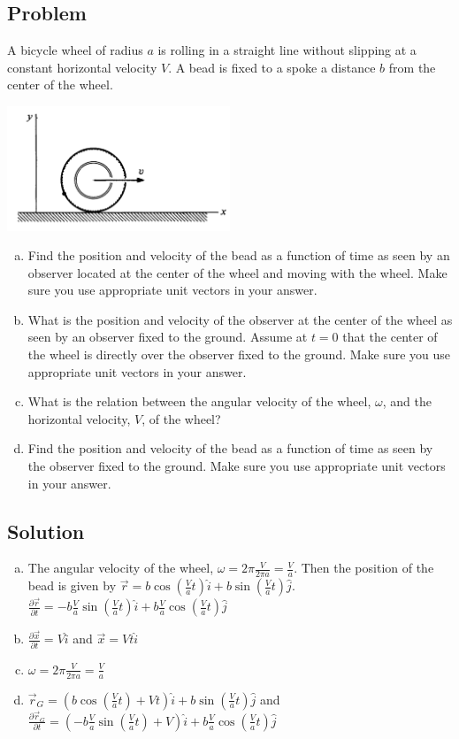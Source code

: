 \documentclass[solutions]{esg8012pset}
\begin{document}
\subsection*{Problem}
  A bicycle wheel of radius $a$ is rolling in a straight line without slipping at a constant horizontal
  velocity $V$. A bead is fixed to a spoke a distance $b$ from the center of the wheel.
  \begin{center}\includegraphics[width=0.5\textwidth]{ps01_3}\end{center}
  \begin{enumerate}[a)]
    \item Find the position and velocity of the bead as a function of time as seen by an observer located
  at the center of the wheel and moving with the wheel. Make sure you use appropriate unit
  vectors in your answer.
    \item What is the position and velocity of the observer at the center of the wheel as seen by an
  observer fixed to the ground. Assume at $t = 0$ that the center of the wheel is directly over the
  observer fixed to the ground. Make sure you use appropriate unit vectors in your answer.
    \item What is the relation between the angular velocity of the wheel, $\omega$, and the horizontal velocity, $V$, of the wheel?
    \item Find the position and velocity of the bead as a function of time as seen by the observer fixed
  to the ground. Make sure you use appropriate unit vectors in your answer.
  \end{enumerate}
\subsection*{Solution}
  \begin{enumerate}[a)]
    \item The angular velocity of the wheel, $\omega = 2\pi \frac{V}{2\pi a} = \frac{V}{a}$.  Then the position of the bead is given by $\vec r = b\cos\left(\frac{V}{a}t\right)\hat i + b\sin\left(\frac{V}{a}t\right)\hat j$.  $\frac{\partial \vec r}{\partial t} = -b\frac{V}{a}\sin\left(\frac{V}{a}t\right)\hat i + b\frac{V}{a}\cos\left(\frac{V}{a}t\right)\hat j$
    \item $\frac{\partial \vec x}{\partial t} = V\hat i$ and $\vec x = V t\hat i$
    \item $\omega = 2\pi \frac{V}{2\pi a} = \frac{V}{a}$
    \item $\vec r_G = \left(b\cos\left(\frac{V}{a}t\right) + Vt\right)\hat i + b\sin\left(\frac{V}{a}t\right)\hat j$ and $\frac{\partial \vec r_G}{\partial t} = \left(-b\frac{V}{a}\sin\left(\frac{V}{a}t\right) + V\right)\hat i + b\frac{V}{a}\cos\left(\frac{V}{a}t\right)\hat j$
  \end{enumerate}
\end{document}
